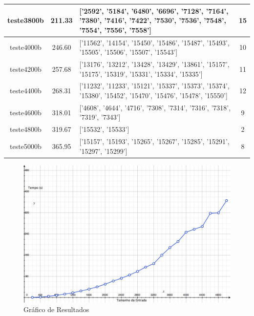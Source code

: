 \documentclass[12pt]{article}
\begin{document}
\begin{table}[h]
\begin{tabular}{c | c || p{8cm} | c}
  \hline
  teste3800b & 211.33 & ['2592', '5184', '6480', '6696', '7128', '7164', '7380', '7416', '7422', '7530', '7536', '7548', '7554', '7556', '7558'] & 15 \\
  \hline
  teste4000b & 246.60 & ['11562', '14154', '15450', '15486', '15487', '15493', '15505', '15506', '15507', '15543'] & 10 \\
  \hline
  teste4200b & 257.68 & ['13176', '13212', '13428', '13429', '13861', '15157', '15175', '15319', '15331', '15334', '15335'] & 11 \\
  \hline
  teste4400b & 268.31 & ['11232', '11233', '15121', '15337', '15373', '15374', '15380', '15452', '15470', '15476', '15478', '15550'] & 12 \\
  \hline
  teste4600b & 318.01 & ['4608', '4644', '4716', '7308', '7314', '7316', '7318', '7319', '7343'] & 9 \\
  \hline
  teste4800b & 319.67 & ['15532', '15533'] & 2 \\
  \hline
  teste5000b & 365.95 & ['15157', '15193', '15265', '15267', '15285', '15291', '15297', '15299'] & 8
\end{tabular}
\end{table}

\begin{figure}[h!]
  \centering
  \includegraphics[width=15cm]{results.jpg}
  \caption{Gráfico de Resultados}
  \label{fig:resultados}
\end{figure}
\end{document}
